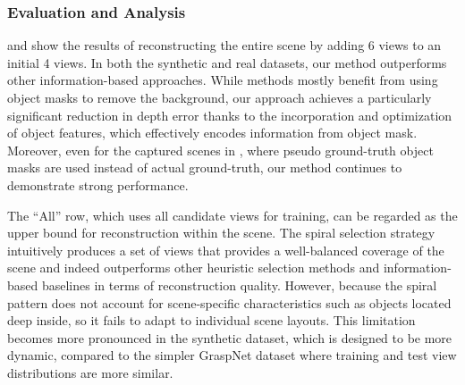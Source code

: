\subsubsection{Evaluation and Analysis}
 and  show the results of reconstructing the entire scene by adding 6 views to an initial 4 views. In both the synthetic and real datasets, our method outperforms other information-based approaches. While methods mostly benefit from using object masks to remove the background, our approach achieves a particularly significant reduction in depth error thanks to the incorporation and optimization of object features, which effectively encodes information from object mask. Moreover, even for the captured scenes in , where pseudo ground-truth object masks are used instead of actual ground-truth, our method continues to demonstrate strong performance.


The “All” row, which uses all candidate views for training, can be regarded as the upper bound for reconstruction within the scene. The spiral selection strategy intuitively produces a set of views that provides a well-balanced coverage of the scene and indeed outperforms other heuristic selection methods and information-based baselines in terms of reconstruction quality. However, because the spiral pattern does not account for scene-specific characteristics such as objects located deep inside, so it fails to adapt to individual scene layouts. This limitation becomes more pronounced in the synthetic dataset, which is designed to be more dynamic, compared to the simpler GraspNet dataset where training and test view distributions are more similar.


